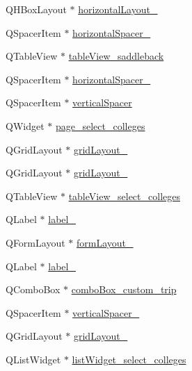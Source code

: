 \begin{DoxyCompactItemize}
\item 
Q\+H\+Box\+Layout $\ast$ \hyperlink{class_ui___main_window_ad81454913b05646674b1a41c595b8510}{horizontal\+Layout\+\_}
\item 
Q\+Spacer\+Item $\ast$ \hyperlink{class_ui___main_window_a9f4fdedd7b0225e858be3636a990216e}{horizontal\+Spacer\+\_}
\item 
Q\+Table\+View $\ast$ \hyperlink{class_ui___main_window_adae5cfc258f6632012dd9fc515e28b22}{table\+View\+\_\+saddleback}
\item 
Q\+Spacer\+Item $\ast$ \hyperlink{class_ui___main_window_a891722aae0849c6010c8c535c8a9f1e8}{horizontal\+Spacer\+\_}
\item 
Q\+Spacer\+Item $\ast$ \hyperlink{class_ui___main_window_a8384329c3663ff274e926a12024aab52}{vertical\+Spacer}
\item 
Q\+Widget $\ast$ \hyperlink{class_ui___main_window_a41adf04876a05e0e2366be11e2247d52}{page\+\_\+select\+\_\+colleges}
\item 
Q\+Grid\+Layout $\ast$ \hyperlink{class_ui___main_window_a0bdc0d6ee9d3d95f58c53d84871f82b9}{grid\+Layout\+\_}
\item 
Q\+Grid\+Layout $\ast$ \hyperlink{class_ui___main_window_a20728ed83bf740332bd908ea3e15ace6}{grid\+Layout\+\_}
\item 
Q\+Table\+View $\ast$ \hyperlink{class_ui___main_window_af320398a318add1bce81a1857cbb4ad9}{table\+View\+\_\+select\+\_\+colleges}
\item 
Q\+Label $\ast$ \hyperlink{class_ui___main_window_af183bfbfb9f38bbdd60caf92b15e23dc}{label\+\_}
\item 
Q\+Form\+Layout $\ast$ \hyperlink{class_ui___main_window_adb9e9053924d82773ec4e07e6c96271f}{form\+Layout\+\_}
\item 
Q\+Label $\ast$ \hyperlink{class_ui___main_window_a4a18586583a48765b392cbab0ea7545c}{label\+\_}
\item 
Q\+Combo\+Box $\ast$ \hyperlink{class_ui___main_window_a46d4c18f13eb1a623bf603cb4a83eb61}{combo\+Box\+\_\+custom\+\_\+trip}
\item 
Q\+Spacer\+Item $\ast$ \hyperlink{class_ui___main_window_ac845bdf6b5b5237378a7b067808b7a31}{vertical\+Spacer\+\_}
\item 
Q\+Grid\+Layout $\ast$ \hyperlink{class_ui___main_window_aa03590dd5aac614bf717649a544c015f}{grid\+Layout\+\_}
\item 
Q\+List\+Widget $\ast$ \hyperlink{class_ui___main_window_a5877187caf2508c07c294a870b32ff43}{list\+Widget\+\_\+select\+\_\+colleges}

\end{DoxyCompactItemize}
